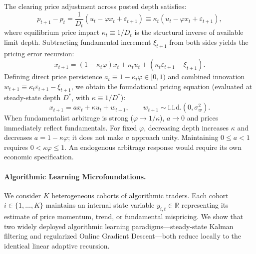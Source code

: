 \documentclass[12pt]{article}
\theoremstyle{definition}
\theoremstyle{remark}
\newcommand{\R}{\mathbb{R}}
\begin{document}
The clearing price adjustment across posted depth satisfies:
\begin{equation}
p_{t+1} - p_t = \frac{1}{D_t} \left( u_t - \varphi x_t + \varepsilon_{t+1} \right) \equiv \kappa_t \left( u_t - \varphi x_t + \varepsilon_{t+1} \right),
\end{equation}
where equilibrium price impact $\kappa_t \equiv 1/D_t$ is the structural inverse of available limit depth. Subtracting fundamental increment $\xi_{t+1}$ from both sides yields the pricing error recursion:
\begin{equation}
x_{t+1} = (1 - \kappa_t \varphi) x_t + \kappa_t u_t + \left( \kappa_t \varepsilon_{t+1} - \xi_{t+1} \right).
\end{equation}
Defining direct price persistence $a_t \equiv 1 - \kappa_t \varphi \in [0, 1)$ and combined innovation $w_{t+1} \equiv \kappa_t \varepsilon_{t+1} - \xi_{t+1}$, we obtain the foundational pricing equation (evaluated at steady-state depth $D^*$, with $\kappa \equiv 1/D^*$):
\begin{equation}
x_{t+1} = a x_t + \kappa u_t + w_{t+1}, \qquad w_{t+1} \sim \text{i.i.d.}(0, \sigma_w^2).
\label{eq:micro_pricing}
\end{equation}
When fundamentalist arbitrage is strong ($\varphi \to 1/\kappa$), $a \to 0$ and prices immediately reflect fundamentals. For fixed $\varphi$, decreasing depth increases $\kappa$ and decreases $a=1-\kappa\varphi$; it does not make $a$ approach unity. Maintaining $0\le a<1$ requires $0<\kappa\varphi\le1$. An endogenous arbitrage response would require its own economic specification.

\paragraph{Algorithmic Learning Microfoundations.}
We consider $K$ heterogeneous cohorts of algorithmic traders. Each cohort $i \in \{1, \dots, K\}$ maintains an internal state variable $y_{i,t} \in \R$ representing its estimate of price momentum, trend, or fundamental mispricing. We show that two widely deployed algorithmic learning paradigms—steady-state Kalman filtering and regularized Online Gradient Descent—both reduce locally to the identical linear adaptive recursion.
\end{document}
